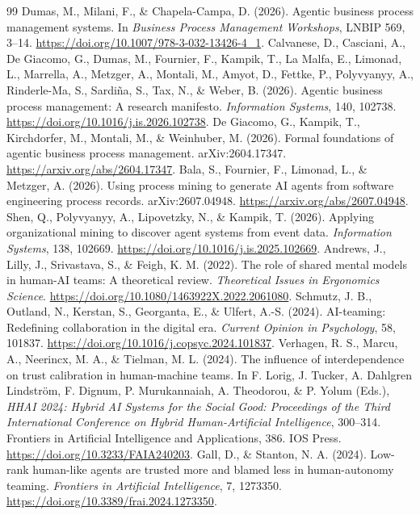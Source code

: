 \documentclass[11pt,letterpaper]{article}
\begin{document}
\begin{thebibliography}{99}
 Dumas, M., Milani, F., \& Chapela-Campa, D. (2026). Agentic business process management systems. In \emph{Business Process Management Workshops}, LNBIP 569, 3--14. \url{https://doi.org/10.1007/978-3-032-13426-4_1}.
 Calvanese, D., Casciani, A., De Giacomo, G., Dumas, M., Fournier, F., Kampik, T., La Malfa, E., Limonad, L., Marrella, A., Metzger, A., Montali, M., Amyot, D., Fettke, P., Polyvyanyy, A., Rinderle-Ma, S., Sardiña, S., Tax, N., \& Weber, B. (2026). Agentic business process management: A research manifesto. \emph{Information Systems}, 140, 102738. \url{https://doi.org/10.1016/j.is.2026.102738}.
 De Giacomo, G., Kampik, T., Kirchdorfer, M., Montali, M., \& Weinhuber, M. (2026). Formal foundations of agentic business process management. arXiv:2604.17347. \url{https://arxiv.org/abs/2604.17347}.
 Bala, S., Fournier, F., Limonad, L., \& Metzger, A. (2026). Using process mining to generate AI agents from software engineering process records. arXiv:2607.04948. \url{https://arxiv.org/abs/2607.04948}.
 Shen, Q., Polyvyanyy, A., Lipovetzky, N., \& Kampik, T. (2026). Applying organizational mining to discover agent systems from event data. \emph{Information Systems}, 138, 102669. \url{https://doi.org/10.1016/j.is.2025.102669}.
 Andrews, J., Lilly, J., Srivastava, S., \& Feigh, K. M. (2022). The role of shared mental models in human-AI teams: A theoretical review. \emph{Theoretical Issues in Ergonomics Science}. \url{https://doi.org/10.1080/1463922X.2022.2061080}.
 Schmutz, J. B., Outland, N., Kerstan, S., Georganta, E., \& Ulfert, A.-S. (2024). AI-teaming: Redefining collaboration in the digital era. \emph{Current Opinion in Psychology}, 58, 101837. \url{https://doi.org/10.1016/j.copsyc.2024.101837}.
 Verhagen, R. S., Marcu, A., Neerincx, M. A., \& Tielman, M. L. (2024). The influence of interdependence on trust calibration in human-machine teams. In F. Lorig, J. Tucker, A. Dahlgren Lindström, F. Dignum, P. Murukannaiah, A. Theodorou, \& P. Yolum (Eds.), \emph{HHAI 2024: Hybrid AI Systems for the Social Good: Proceedings of the Third International Conference on Hybrid Human-Artificial Intelligence}, 300--314. Frontiers in Artificial Intelligence and Applications, 386. IOS Press. \url{https://doi.org/10.3233/FAIA240203}.
 Gall, D., \& Stanton, N. A. (2024). Low-rank human-like agents are trusted more and blamed less in human-autonomy teaming. \emph{Frontiers in Artificial Intelligence}, 7, 1273350. \url{https://doi.org/10.3389/frai.2024.1273350}.

\end{thebibliography}
\end{document}

